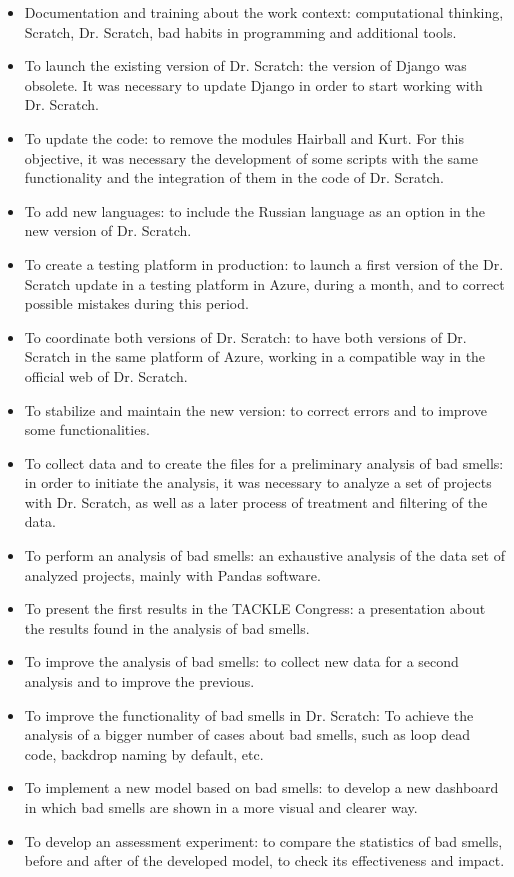 \begin{itemize}
    \item Documentation and training about the work context: computational thinking, Scratch, Dr. Scratch, bad habits in programming and additional tools. 
    \item To launch the existing version of Dr. Scratch: the version of Django was obsolete. It was necessary to update Django in order to start working with Dr. Scratch. 
    \item To update the code: to remove the modules Hairball and Kurt. For this objective, it was necessary the development of some scripts with the same functionality and the integration of them in the code of Dr. Scratch.
    \item To add new languages: to include the Russian language as an option in the new version of Dr. Scratch.
    \item To create a testing platform in production: to launch a first version of the Dr. Scratch update in a testing platform in Azure, during a month, and to correct possible mistakes during this period.
    \item To coordinate both versions of Dr. Scratch: to have both versions of Dr. Scratch in the same platform of Azure, working in a compatible way in the official web of Dr. Scratch.
    \item To stabilize and maintain the new version: to correct errors and to improve some functionalities.
    \item To collect data and to create the files for a preliminary analysis of bad smells: in order to initiate the analysis, it was necessary to analyze a set of projects with Dr. Scratch, as well as a later process of treatment and filtering of the data.
    \item To perform an analysis of bad smells: an exhaustive analysis of the data set of analyzed projects, mainly with Pandas software. 
    \item To present the first results in the TACKLE Congress: a presentation about the results found in the analysis of bad smells.
    \item To improve the analysis of bad smells: to collect new data for a second analysis and to improve the previous.
    \item To improve the functionality of bad smells in Dr. Scratch: To achieve the analysis of a bigger number of cases about bad smells, such as loop dead code, backdrop naming by default, etc.
    \item To implement a new model based on bad smells: to develop a new dashboard in which bad smells are shown in a more visual and clearer way.
    \item To develop an assessment experiment: to compare the statistics of bad smells, before and after of the developed model, to check its effectiveness and impact.
    
\end{itemize}



